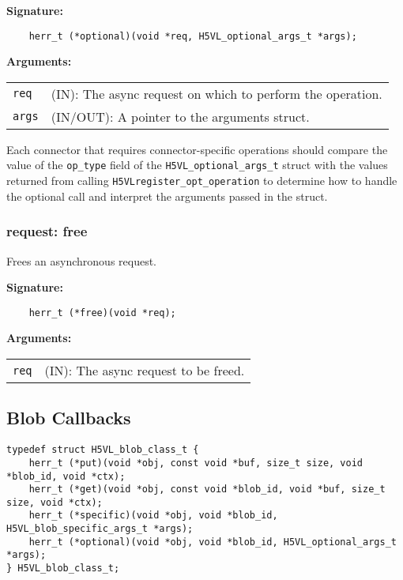 \begin{mdframed}[style=bgbox]
\textbf{Signature:}
\begin{lstlisting}
    herr_t (*optional)(void *req, H5VL_optional_args_t *args);                            
\end{lstlisting}

\textbf{Arguments:}\\
\begin{tabular}{l p{13.5cm}}
  \texttt{req} & (IN): The async request on which to perform the operation.\\
  \texttt{args} & (IN/OUT): A pointer to the arguments struct.\\
\end{tabular}
\end{mdframed}

Each connector that requires connector-specific operations should compare the
value of the {\tt op\_type} field of the {\tt H5VL\_optional\_args\_t} struct
with the values returned from calling {\tt H5VLregister\_opt\_operation} to
determine how to handle the optional call and interpret the arguments passed
in the struct.


\subsubsection{request: free}
Frees an asynchronous request.

\begin{mdframed}[style=bgbox]
\textbf{Signature:}
\begin{lstlisting}
    herr_t (*free)(void *req);                                                   
\end{lstlisting}

\textbf{Arguments:}\\
\begin{tabular}{l p{13.5cm}}
  \texttt{req} & (IN): The async request to be freed.\\
\end{tabular}
\end{mdframed}



\subsection{Blob Callbacks}
\begin{lstlisting}[caption={Structure for blob callback routines, H5VLconnector.h}, captionpos=b, label={lst:Blobclass}]
typedef struct H5VL_blob_class_t {                                               
    herr_t (*put)(void *obj, const void *buf, size_t size, void *blob_id, void *ctx);
    herr_t (*get)(void *obj, const void *blob_id, void *buf, size_t size, void *ctx);
    herr_t (*specific)(void *obj, void *blob_id, H5VL_blob_specific_args_t *args);
    herr_t (*optional)(void *obj, void *blob_id, H5VL_optional_args_t *args);
} H5VL_blob_class_t; 
\end{lstlisting}

